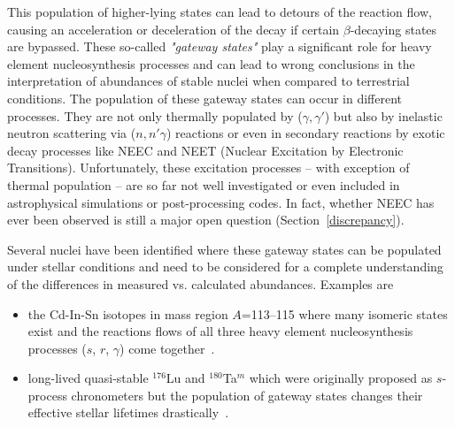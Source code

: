 \documentclass[12pt]{article}
\begin{document}
This population of higher-lying states can lead to detours of the reaction flow, causing an acceleration or deceleration of the decay if certain $\beta$-decaying states are bypassed. These so-called \textit{"gateway states"} play a significant role for heavy element nucleosynthesis processes and can lead to wrong conclusions in the interpretation of abundances of stable nuclei when compared to terrestrial conditions.  The population of these gateway states can occur in different processes. They are not only thermally populated by ($\gamma, \gamma'$) but also by inelastic neutron scattering via ($n,n' \gamma$) reactions or even in secondary reactions by exotic decay processes like NEEC and NEET (Nuclear Excitation by Electronic Transitions). Unfortunately, these excitation processes -- with exception of thermal population -- are so far not well investigated or even included in astrophysical simulations or post-processing codes.  In fact, whether NEEC has ever been observed is still a major open question (Section~\ref{discrepancy}).

Several nuclei have been identified where these gateway states can be populated under stellar conditions and need to be considered for a complete understanding of the differences in measured vs. calculated abundances. Examples are
\begin{itemize}
    \item the Cd-In-Sn isotopes in mass region $A$=113--115 where many isomeric states exist and the reactions flows of all three heavy element nucleosynthesis processes ($s$, $r$, $\gamma$) come together~\cite{Nem94}.
    \vspace{-10pt}
    \item long-lived quasi-stable $^{176}$Lu and $^{180}$Ta$^m$ which were originally proposed as $s$-process chronometers but the population of gateway states changes their effective stellar lifetimes drastically~\cite{Car89}.
\end{itemize}


\end{document}
